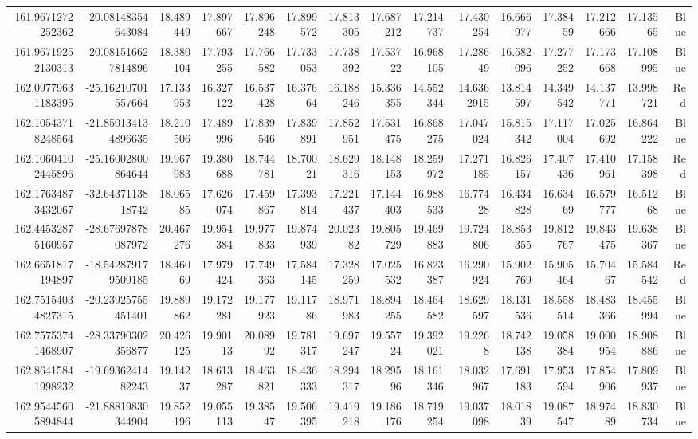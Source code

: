 \begin{center}
\begin{longtable}{rrrrrrrrrrrrrrr}
161.9671272252362 & -20.08148354643084 & 18.489449 & 17.897667 & 17.896248 & 17.899572 & 17.813305 & 17.687212 & 17.214737 & 17.430254 & 16.666977 & 17.38459 & 17.212666 & 17.13565 & Blue \\
161.96719252130313 & -20.081516627814896 & 18.380104 & 17.793255 & 17.766582 & 17.733053 & 17.738392 & 17.53722 & 16.968105 & 17.28649 & 16.582096 & 17.277252 & 17.173668 & 17.108995 & Blue \\
162.09779631183395 & -25.16210701557664 & 17.133953 & 16.327122 & 16.537428 & 16.37664 & 16.188246 & 15.336355 & 14.552344 & 14.6362915 & 13.814597 & 14.349542 & 14.137771 & 13.998721 & Red \\
162.10543718248564 & -21.850134134896635 & 18.210506 & 17.489996 & 17.839546 & 17.839891 & 17.852951 & 17.531475 & 16.868275 & 17.047024 & 15.815342 & 17.117004 & 17.025692 & 16.864222 & Blue \\
162.10604102445896 & -25.16002800864644 & 19.967983 & 19.380688 & 18.744781 & 18.70021 & 18.629316 & 18.148153 & 18.259972 & 17.271185 & 16.826157 & 17.407436 & 17.410961 & 17.158398 & Red \\
162.17634873432067 & -32.6437113818742 & 18.06585 & 17.626074 & 17.459867 & 17.393814 & 17.221437 & 17.144403 & 16.988533 & 16.77428 & 16.434828 & 16.63469 & 16.579777 & 16.51268 & Blue \\
162.44532875160957 & -28.67697878087972 & 20.467276 & 19.954384 & 19.977833 & 19.874939 & 20.02382 & 19.805729 & 19.469883 & 19.724806 & 18.853355 & 19.812767 & 19.843475 & 19.638367 & Blue \\
162.6651817194897 & -18.542879179509185 & 18.46069 & 17.979424 & 17.749363 & 17.584145 & 17.328259 & 17.025532 & 16.823387 & 16.290924 & 15.902769 & 15.905464 & 15.70467 & 15.584542 & Red \\
162.75154034827315 & -20.23925755451401 & 19.889862 & 19.172281 & 19.177923 & 19.11786 & 18.971983 & 18.894255 & 18.464582 & 18.629597 & 18.131536 & 18.558514 & 18.483366 & 18.455994 & Blue \\
162.75753741468907 & -28.33790302356877 & 20.426125 & 19.90113 & 20.08992 & 19.781317 & 19.697247 & 19.55724 & 19.392021 & 19.2268 & 18.742138 & 19.058384 & 19.000954 & 18.908886 & Blue \\
162.86415841998232 & -19.6936241482243 & 19.14237 & 18.613287 & 18.463821 & 18.436333 & 18.294317 & 18.29596 & 18.161346 & 18.032967 & 17.691183 & 17.953594 & 17.854906 & 17.809937 & Blue \\
162.95445605894844 & -21.88819830344904 & 19.852196 & 19.055113 & 19.38547 & 19.506395 & 19.419218 & 19.186176 & 18.719254 & 19.037098 & 18.01839 & 19.087547 & 18.97489 & 18.830734 & Blue \\

\end{longtable}
\end{center}
